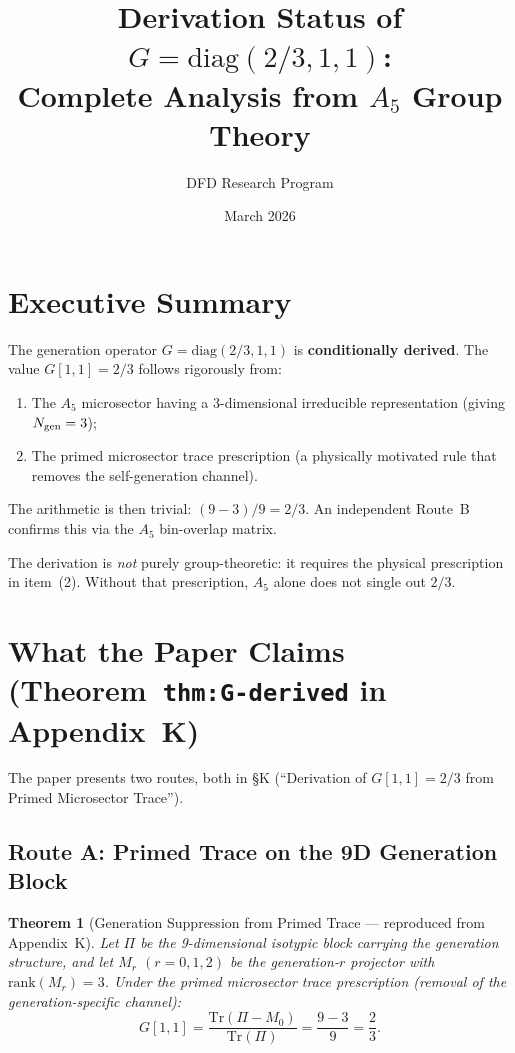 \documentclass[11pt]{article}
\title{Derivation Status of $G = \mathrm{diag}(2/3, 1, 1)$:\\
Complete Analysis from $A_5$ Group Theory}
\author{DFD Research Program}
\date{March 2026}
\newtheorem{theorem}{Theorem}
\theoremstyle{definition}
\begin{document}
\maketitle

\section{Executive Summary}

The generation operator $G = \mathrm{diag}(2/3, 1, 1)$ is \textbf{conditionally derived}.
The value $G[1,1] = 2/3$ follows rigorously from:
\begin{enumerate}
\item The $A_5$ microsector having a 3-dimensional irreducible representation (giving $N_{\rm gen} = 3$);
\item The primed microsector trace prescription (a physically motivated rule that removes the self-generation channel).
\end{enumerate}
The arithmetic is then trivial: $(9-3)/9 = 2/3$. An independent Route~B confirms this via the $A_5$ bin-overlap matrix.

The derivation is \emph{not} purely group-theoretic: it requires the physical prescription in item~(2).
Without that prescription, $A_5$ alone does not single out $2/3$.

\section{What the Paper Claims (Theorem~\texttt{thm:G-derived} in Appendix~K)}

The paper presents two routes, both in \S K (``Derivation of $G[1,1] = 2/3$ from Primed Microsector Trace'').

\subsection{Route A: Primed Trace on the 9D Generation Block}

\begin{theorem}[Generation Suppression from Primed Trace --- reproduced from Appendix~K]
Let $\Pi$ be the 9-dimensional isotypic block carrying the generation structure,
and let $M_r$ $(r = 0,1,2)$ be the generation-$r$ projector with $\mathrm{rank}(M_r) = 3$.
Under the primed microsector trace prescription (removal of the generation-specific channel):
\begin{equation}
\boxed{G[1,1] = \frac{\mathrm{Tr}(\Pi - M_0)}{\mathrm{Tr}(\Pi)} = \frac{9-3}{9} = \frac{2}{3}.}
\end{equation}
\end{theorem}
\end{document}

